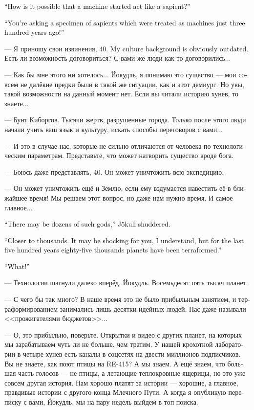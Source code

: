 \documentclass[a4paper,12pt,fleqn]{book}\usepackage{cooltooltips}\usepackage{polyglossia}\setdefaultlanguage[babelshorthands=true]{russian}\setotherlanguage{english}\defaultfontfeatures{Ligatures=TeX,Mapping=tex-text} \usepackage{xcolor}\definecolor{lightgray}{HTML}{bbbbbb}\color{lightgray}\newcommand{\ml}[3]{\textenglish{\textcolor{black}{#3}}}
\begin{document}
\ml{$0$}
{--- Как вообще могло получиться, что машина начала вести себя как разумное существо?}
{``How is it possible that a machine started act like a sapient?''}

\ml{$0$}
{--- Вы спрашиваете у существа, которое ещё триста лет назад считали машиной!}
{``You're asking a specimen of sapients which were treated as machines just three hundred years ago!''}

--- Я приношу свои извинения, 40.
\ml{$0$}
{Мой культурный код явно устарел.}
{My culture background is obviously outdated.}
Есть ли возможность договориться?
С вами же люди как-то договорились...

--- Как бы мне этого ни хотелось...
Йокудль, я понимаю это существо --- мои совсем не далёкие предки были в такой же ситуации, как и этот демиург.
Но увы, такой возможности на данный момент нет.
Если вы читали историю хунев, то знаете...

--- Бунт Киборгов.
Тысячи жертв, разрушенные города.
Только после этого люди начали учить ваш язык и культуру, искать способы переговоров с вами...

--- И это в случае нас, которые не сильно отличаются от человека по технологическим параметрам.
Представьте, что может натворить существо вроде бога.

--- Боюсь даже представлять, 40.
Он может уничтожить всю экспедицию.

--- Он может уничтожить ещё и Землю, если ему вздумается навестить её в ближайшее время!
Мы решаем этот вопрос, но даже нам нужно время.
И самое главное...

\ml{$0$}
{--- Таких богов могут быть десятки, --- Йокудль вздрогнул.}
{``There may be dozens of such gods,'' Jökull shuddered.}

\ml{$0$}
{--- Ближе к тысячам.}
{``Closer to thousands.}
\ml{$0$}
{Я понимаю, что для вас это может быть шок, но за последние 500 лет были терраформированы восемьдесят пять тысяч планет.}
{It may be shocking for you, I understand, but for the last five hundred years eighty-five thousands planets have been terraformed.''}

\ml{$0$}
{--- Сколько?!}
{``What!''}

--- Технологии шагнули далеко вперёд, Йокудль.
Восемьдесят пять тысяч планет.

--- С чего бы так много?
В наше время это не было прибыльным занятием, и терраформированием занимались лишь десятки идейных людей.
Нас даже называли <<прожигателями бюджетов>>...

--- О, это прибыльно, поверьте.
Открытки и видео с других планет, на которых мы зарабатываем чуть ли не больше, чем тратим.
У нашей крохотной лаборатории в четыре хунев есть каналы в соцсетях на двести миллионов подписчиков.
Вы не знаете, как поют птицы на RE-415?
А мы знаем.
А ещё знаем, что большая часть голосов --- не птицы, а летающие теплокровные ящерицы, но это уже совсем другая история.
Нам хорошо платят за истории --- хорошие, а главное, правдивые истории с другого конца Млечного Пути.
А когда я опубликую переписку с вами, Йокудль, мы на пару недель выйдем в топ поиска.
\end{document}
